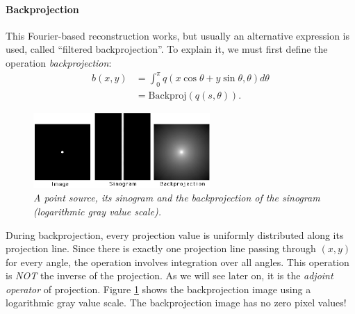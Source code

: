 \documentclass[11pt,oneside]{article}
\begin{document}
\paragraph{Backprojection} \label{sec:backprojection}
This Fourier-based reconstruction works, but usually an alternative expression
is used, called ``filtered backprojection''. To explain it, we must first define
the operation {\em backprojection}:
\begin{align}
 b(x,y) &= \int_0^\pi q(x \cos \theta + y \sin \theta, \theta) d \theta
             \nonumber\\
      &= \mbox{Backproj} \left( q(s, \theta) \right). \label{eq:jnbackproj}
\end{align}

\begin{figure}[tb]
\centering
\includegraphics[width=0.6\textwidth]{figs/fig_backproj.pdf}
\caption{\label{fig:backproj} \emph{A point source, its sinogram and the
backprojection of the sinogram (logarithmic gray value scale).}}
\end{figure}

During backprojection, every projection value is uniformly distributed
along its projection line. Since there is exactly one projection line
passing through $(x,y)$ for every angle, the operation involves
integration over all angles. This operation is {\em NOT} the inverse
of the projection. As we will see later on, it is the {\em adjoint
operator} of projection. Figure \ref{fig:backproj} shows the
backprojection image using a logarithmic gray value scale. The
backprojection image has no zero pixel values!
\end{document}
